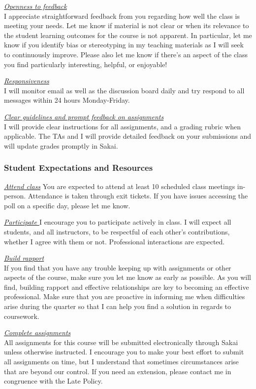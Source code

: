 \documentclass[
  letterpaper,
  DIV=11,
  numbers=noendperiod]{scrartcl}
\begin{document}
\ul{\emph{Openness to feedback}}\\
I appreciate straightforward feedback from you regarding how well the
class is meeting your needs. Let me know if material is not clear or
when its relevance to the student learning outcomes for the course is
not apparent. In particular, let me know if you identify bias or
stereotyping in my teaching materials as I will seek to continuously
improve. Please also let me know if there's an aspect of the class you
find particularly interesting, helpful, or enjoyable!

\ul{\emph{Responsiveness\\
}}I will monitor email as well as the discussion board daily and try
respond to all messages within 24 hours Monday-Friday.

\ul{\emph{Clear guidelines and prompt feedback on assignments}}\\
I will provide clear instructions for all assignments, and a grading
rubric when applicable. The TAs and I will provide detailed feedback on
your submissions and will update grades promptly in Sakai.

\subsubsection{Student Expectations and
Resources}\label{student-expectations-and-resources}

\ul{\emph{Attend class}}\textbf{\hfill\break
}You are expected to attend at least 10 scheduled class meetings
in-person. Attendance is taken through exit tickets. If you have issues
accessing the poll on a specific day, please let me know.~

\ul{\emph{Participate\textbf{\hfill\break
}}}I encourage you to participate actively in class. I will expect all
students, and all instructors, to be respectful of each other's
contributions, whether I agree with them or not. Professional
interactions are expected.

\ul{\emph{Build rapport}}\\
If you find that you have any trouble keeping up with assignments or
other aspects of the course, make sure you let me know as early as
possible. As you will find, building rapport and effective relationships
are key to becoming an effective professional. Make sure that you are
proactive in informing me when difficulties arise during the quarter so
that I can help you find a solution in regards to coursework.

\ul{\emph{Complete assignments}}\\
All assignments for this course will be submitted electronically through
Sakai unless otherwise instructed. I encourage you to make your best
effort to submit all assignments on time, but I understand that
sometimes circumstances arise that are beyond our control. If you need
an extension, please contact me in congruence with the Late Policy.
\end{document}
